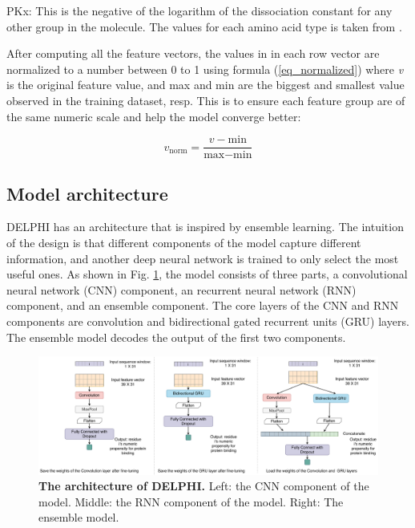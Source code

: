 \documentclass{bioinfo}
\begin{document}
\begin{methods}
PKx: This is the negative of the logarithm of the dissociation constant for any other group in the molecule. The values for each amino acid type is taken from \citep{zhang2019sequence}.

After computing all the feature vectors, the values in in each row vector are normalized to a number between 0 to 1 using formula (\ref{eq_normalized}) where \textit{v} is the original feature value, and max and min are the biggest and smallest value observed in the training dataset, resp. This is to ensure each feature group are of the same numeric scale and help the model converge better:

\begin{equation}
v_\text{norm}=\dfrac{v-\text{min}}{\text{max}-\text{min}}\label{eq_normalized}
\end{equation}



\subsection{Model architecture}
DELPHI has an architecture that is inspired by ensemble learning. The intuition of the design is that different components of the model capture different information, and another deep neural network is trained to only select the most useful ones. As shown in Fig. \ref{fig_architecture}, the model consists of three parts, a convolutional neural network (CNN) component, an recurrent neural network (RNN) component, and an ensemble component. The core layers of the CNN and RNN components are convolution and bidirectional gated recurrent units (GRU) layers. The ensemble model decodes the output of the first two components.  
\begin{figure}
\centering
\includegraphics[width=\textwidth]{Model_architecture.pdf}
  \caption{\textbf{The architecture of DELPHI.} Left: the CNN component of the model. Middle: the RNN component of the model. Right: The ensemble model. 
  \label{fig_architecture}}
\end{figure}


\end{methods}
\end{document}

